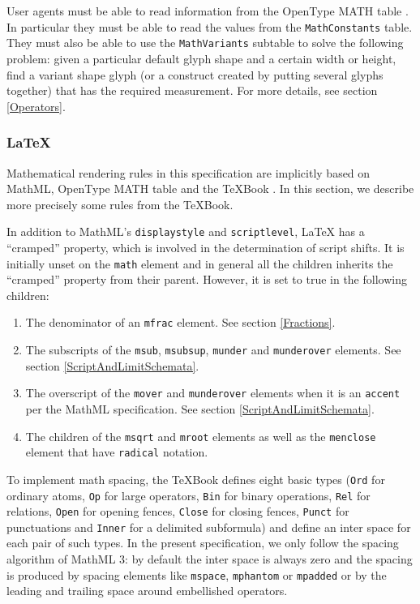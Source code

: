 User agents must be able to read information from the
OpenType MATH table \cite{OpenFontFormat3}.
In particular they must be able to read the values from the
{\tt MathConstants} table.
They must also be able to use the {\tt MathVariants} subtable
to solve the following problem: given a particular default glyph shape and a
certain width or height, find a variant shape glyph (or a construct created by
putting several glyphs together) that has the required measurement.
For more details, see section \ref{Operators}.

\subsubsection{LaTeX}\label{LaTeX}

Mathematical rendering rules in this specification are implicitly based on
MathML, OpenType MATH table and the TeXBook
\cite{MathML3} \cite{OpenFontFormat3} \cite{TeXBook}. In this section, we
describe more precisely some rules from the TeXBook.

In addition to MathML's {\tt displaystyle} and {\tt scriptlevel}, LaTeX has
a ``cramped'' property, which is involved in the determination of script shifts.
It is initially unset on the {\tt math} element and in general
all the children inherits the ``cramped'' property from their parent.
However, it is set to true in the following children:

\begin{enumerate}
\item The denominator of an {\tt mfrac} element. See section \ref{Fractions}.
\item The subscripts of the {\tt msub}, {\tt msubsup},
  {\tt munder} and {\tt munderover} elements.
  See section \ref{ScriptAndLimitSchemata}.
\item The overscript of the
  {\tt mover} and {\tt munderover} elements when it is an {\tt accent} per
  the MathML specification. See section \ref{ScriptAndLimitSchemata}.
\item The children of the {\tt msqrt} and {\tt mroot}
  elements as well as the {\tt menclose} element that have {\tt radical}
  notation.
\end{enumerate}

To implement math spacing, the TeXBook defines eight basic types
({\tt Ord} for ordinary atoms, {\tt Op} for large operators,
{\tt Bin} for binary operations, {\tt Rel} for relations,
{\tt Open} for opening fences, {\tt Close} for closing fences,
{\tt Punct} for punctuations and {\tt Inner} for a delimited subformula) and
define an inter space for each pair of such types. In the present specification,
we only follow the spacing algorithm of MathML 3: by default the inter space
is always zero and the spacing is produced by spacing elements like
{\tt mspace}, {\tt mphantom} or {\tt mpadded} or by the leading and trailing
space around embellished operators.

